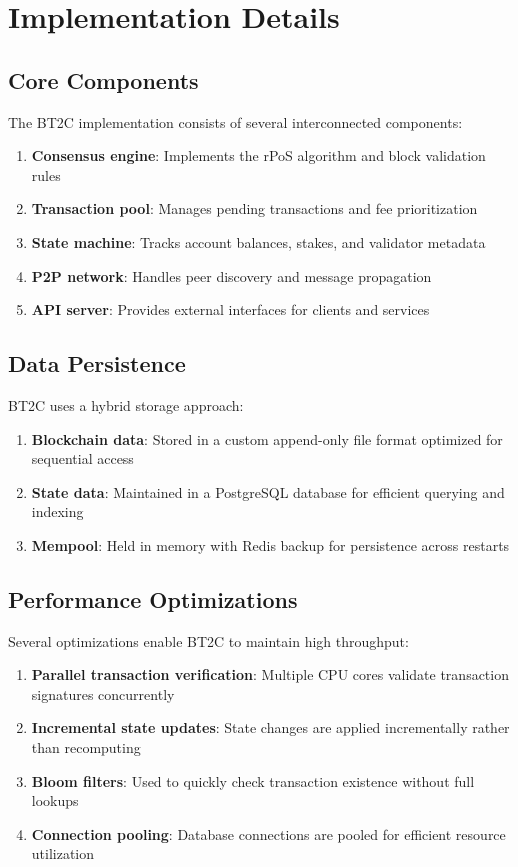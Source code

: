 \documentclass[10pt,a4paper]{article}
\begin{document}
\section{Implementation Details}

\subsection{Core Components}
The BT2C implementation consists of several interconnected components:

\begin{enumerate}
\item \textbf{Consensus engine}: Implements the rPoS algorithm and block validation rules
\item \textbf{Transaction pool}: Manages pending transactions and fee prioritization
\item \textbf{State machine}: Tracks account balances, stakes, and validator metadata
\item \textbf{P2P network}: Handles peer discovery and message propagation
\item \textbf{API server}: Provides external interfaces for clients and services
\end{enumerate}

\subsection{Data Persistence}
BT2C uses a hybrid storage approach:

\begin{enumerate}
\item \textbf{Blockchain data}: Stored in a custom append-only file format optimized for sequential access
\item \textbf{State data}: Maintained in a PostgreSQL database for efficient querying and indexing
\item \textbf{Mempool}: Held in memory with Redis backup for persistence across restarts
\end{enumerate}

\subsection{Performance Optimizations}
Several optimizations enable BT2C to maintain high throughput:

\begin{enumerate}
\item \textbf{Parallel transaction verification}: Multiple CPU cores validate transaction signatures concurrently
\item \textbf{Incremental state updates}: State changes are applied incrementally rather than recomputing
\item \textbf{Bloom filters}: Used to quickly check transaction existence without full lookups
\item \textbf{Connection pooling}: Database connections are pooled for efficient resource utilization
\end{enumerate}
\end{document}
